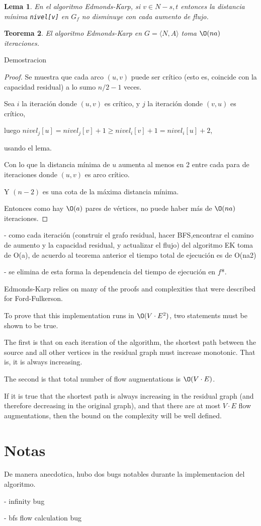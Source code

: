 \documentclass[12pt, a4paper]{article}
\newtheorem{theorem}{Teorema}[section]
\newtheorem{lemma}[theorem]{Lema}
\begin{document}
\begin{lemma}
En el algoritmo Edmonds-Karp, si $v \in N - {s,t}$ entonces la distancia mínima \texttt{nivel[v]} en $G_{f}$ no disminuye con cada aumento de flujo.
\end{lemma}

\begin{theorem}
El algoritmo Edmonds-Karp en $G =\langle N,A \rangle$ toma $\O(na)$ iteraciones.
\end{theorem}

Demostracion

\begin{proof}
Se muestra que cada arco $(u,v)$ puede ser crítico (esto es, coincide con la capacidad residual) a lo sumo $n/2-1$ veces.

Sea $i$ la iteración donde $(u,v)$ es crítico, y $j$ la iteración donde $(v,u)$ es crítico, 

luego $nivel_{j}[u] = nivel_{j}[v] + 1 \geq	nivel_{i}[v] + 1 = nivel_{i}[u] + 2$,

usando el lema. 

Con lo que la distancia mínima de $u$ aumenta al menos en 2 entre cada para de iteraciones donde $(u,v)$ es arco crítico.

Y $(n-2)$ es una cota de la máxima distancia mínima.

Entonces como hay $\O(a)$ pares de vértices, no puede haber más de $\O(na)$ iteraciones.
\end{proof}

- como cada iteración (construir el grafo residual, hacer BFS,encontrar el camino de aumento y la capacidad residual, y actualizar el flujo) del algoritmo EK toma de O(a), de acuerdo al teorema anterior el tiempo total de ejecución es de O(na2) 

- se elimina de esta forma la dependencia del tiempo de ejecución en $f$*.

Edmonds-Karp relies on many of the proofs and complexities that were described for Ford-Fulkerson. 

To prove that this implementation runs in $\O(V \cdot E^2)$, two statements must be shown to be true. 

The first is that on each iteration of the algorithm, the shortest path between the source and all other vertices in the residual graph must increase monotonic. 
That is, it is always increasing. 

The second is that total number of flow augmentations is $\O(V \cdot E)$. 

If it is true that the shortest path is always increasing in the residual graph (and therefore decreasing in the original graph), and that there are at most $V \cdot E$ flow augmentations, then the bound on the complexity will be well defined. 

\section{Notas}
De manera anecdotica, hubo dos bugs notables durante la implementacion del algoritmo.

- infinity bug

- bfs flow calculation bug
\end{document}
